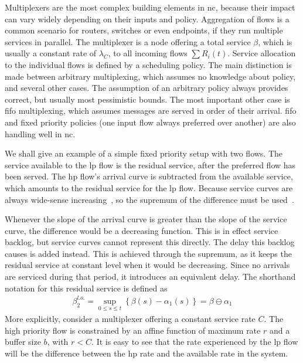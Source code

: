 Multiplexers are the most complex building elements in \gls{nc}, because their impact can vary widely depending on their inputs and policy.
Aggregation of flows is a common scenario for routers, switches or even endpoints, if they run multiple services in parallel.
The multiplexer is a node offering a total service $\beta$, which is usually a constant rate of  $\lambda_C$, to all incoming flows $\sum R_i(t)$.
Service allocation to the individual flows is defined by a scheduling policy. The main distinction is made between arbitrary multiplexing, which assumes
no knowledge about policy, and several other cases. The assumption of an arbitrary policy always provides correct, but usually most pessimistic bounds.
The most important other case is \gls{fifo} multiplexing, which assumes messages are served in order of their arrival.
\gls{fifo} and fixed priority policies (one input flow always preferred over another) are also handling well in \gls{nc}.
\par
We shall give an example of a simple fixed priority setup with two flows.
The service available to the \gls{lp} flow is the residual service, after the preferred flow has been served.
The \gls{hp} flow's arrival curve is subtracted from the available service, which amounts to the residual service for the \gls{lp} flow.
Because service curves are always wide-sense increasing~\cite[p. 19]{thiran_network_2001}, so the supremum of the difference must be used~\cite{schmitt_comprehensive_2007}.
\par
Whenever the slope of the arrival curve is greater than the slope of the service curve, the difference would be a decreasing function. This is in effect service backlog,
but service curves cannot represent this directly. The delay this backlog causes is added instead.
This is achieved through the supremum, as it keeps the residual service at constant level when it would be decreasing. Since no arrivals are serviced during that period, it introduces an equivalent delay.
The shorthand notation for this residual service is defined as
%
\begin{align}
\beta^{l.o.}_2 = \sup_{0 \le s \le t}\left\{\beta(s) - \alpha_1(s)\right\} = \beta \ominus \alpha_1
\label{eq:nc_res_serv0}
\end{align}
%
More explicitly, consider a multiplexer offering a constant service rate $C$. The high priority flow is constrained by an affine function of maximum rate $r$ and a buffer size $b$, with $r < C$.
It is easy to see that the rate experienced by the \gls{lp} flow will be the difference between the \gls{hp} rate and the available rate in the system.

